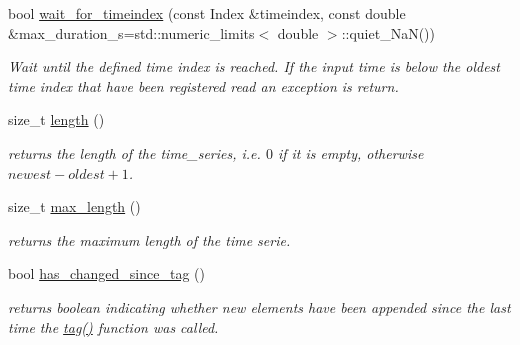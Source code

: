 \begin{DoxyCompactItemize}
\mbox{\label{classtime__series_1_1internal_1_1TimeSeriesBase_a5651e522492514408e38a5b99e144a06}} 
bool \hyperlink{classtime__series_1_1internal_1_1TimeSeriesBase_a5651e522492514408e38a5b99e144a06}{wait\+\_\+for\+\_\+timeindex} (const Index \&timeindex, const double \&max\+\_\+duration\+\_\+s=std\+::numeric\+\_\+limits$<$ double $>$\+::quiet\+\_\+\+NaN())
\begin{DoxyCompactList}\small\item\em Wait until the defined time index is reached. If the input time is below the oldest time index that have been registered read an exception is return. \end{DoxyCompactList}\item 
\mbox{\label{classtime__series_1_1internal_1_1TimeSeriesBase_ae6da9bd31ca06b30413f2073bc2e48e6}} 
size\+\_\+t \hyperlink{classtime__series_1_1internal_1_1TimeSeriesBase_ae6da9bd31ca06b30413f2073bc2e48e6}{length} ()
\begin{DoxyCompactList}\small\item\em returns the length of the time\+\_\+series, i.\+e. $0$ if it is empty, otherwise $newest - oldest +1 $. \end{DoxyCompactList}\item 
size\+\_\+t \hyperlink{classtime__series_1_1internal_1_1TimeSeriesBase_aee1bf636a094a3068f9de731688c3972}{max\+\_\+length} ()
\begin{DoxyCompactList}\small\item\em returns the maximum length of the time serie. \end{DoxyCompactList}\item 
\mbox{\label{classtime__series_1_1internal_1_1TimeSeriesBase_a38511cb227e3e423922eaaea626a15ee}} 
bool \hyperlink{classtime__series_1_1internal_1_1TimeSeriesBase_a38511cb227e3e423922eaaea626a15ee}{has\+\_\+changed\+\_\+since\+\_\+tag} ()
\begin{DoxyCompactList}\small\item\em returns boolean indicating whether new elements have been appended since the last time the \hyperlink{classtime__series_1_1internal_1_1TimeSeriesBase_ad20c1f90dd2f9016f32132caa3f976f7}{tag()} function was called. \end{DoxyCompactList}\item 

\end{DoxyCompactItemize}

